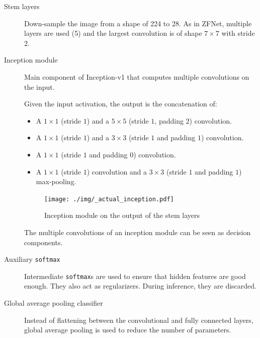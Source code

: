 \begin{description}
    \item[Stem layers]
        Down-sample the image from a shape of 224 to 28.
        As in ZFNet, multiple layers are used (5) and the largest convolution is of shape $7 \times 7$ with stride $2$.

    \item[Inception module] 
        Main component of Inception-v1 that computes multiple convolutions on the input.

        Given the input activation, the output is the concatenation of:
        \begin{itemize}
            \item A $1 \times 1$ (stride $1$) and a $5 \times 5$ (stride $1$, padding $2$) convolution.
            \item A $1 \times 1$ (stride $1$) and a $3 \times 3$ (stride $1$ and padding $1$) convolution.
            \item A $1 \times 1$ (stride $1$ and padding $0$) convolution.
            \item A $1 \times 1$ (stride $1$) convolution and a $3 \times 3$ (stride $1$ and padding $1$) max-pooling.
        \end{itemize} 

        \begin{figure}[H]
            \centering
            \texttt{[image: ./img/\_actual\_inception.pdf]}
            \caption{Inception module on the output of the stem layers}
        \end{figure}

        \begin{remark}
            The multiple convolutions of an inception module can be seen as decision components.
        \end{remark}

    \item[Auxiliary \texttt{softmax}]
        Intermediate \texttt{softmax}s are used to ensure that hidden features are good enough.
        They also act as regularizers. During inference, they are discarded.

    \item[Global average pooling classifier] 
        Instead of flattening between the convolutional and fully connected layers, 
        global average pooling is used to reduce the number of parameters.
\end{description}

